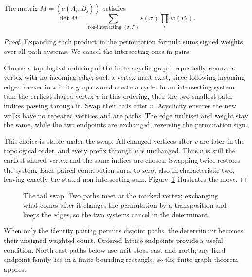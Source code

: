 \begin{theorem}\label{linear:thm:lgv}
The matrix $M=(e(A_i,B_j))$ satisfies
\[\det M=\sum_{\text{non-intersecting }(\sigma,P)}\varepsilon(\sigma)\prod_iw(P_i).\]
\end{theorem}
\begin{proof}
Expanding each product in the permutation formula sums signed weights over all path systems. We cancel the intersecting ones in pairs.

Choose a topological ordering of the finite acyclic graph: repeatedly remove a vertex with no incoming edge; such a vertex must exist, since following incoming edges forever in a finite graph would create a cycle. In an intersecting system, take the earliest shared vertex $v$ in this ordering, then the two smallest path indices passing through it. Swap their tails after $v$. Acyclicity ensures the new walks have no repeated vertices and are paths. The edge multiset and weight stay the same, while the two endpoints are exchanged, reversing the permutation sign.

This choice is stable under the swap. All changed vertices after $v$ are later in the topological order, and every prefix through $v$ is unchanged. Thus $v$ is still the earliest shared vertex and the same indices are chosen. Swapping twice restores the system. Each paired contribution sums to zero, also in characteristic two, leaving exactly the stated non-intersecting sum. Figure~\ref{linear:fig:lgv} illustrates the move.
\end{proof}
\begin{figure}[ht]
\centering
{}
\caption{The tail swap. Two paths meet at the marked vertex; exchanging what comes after it changes the permutation by a
transposition and keeps the edges, so the two systems cancel in the determinant.}
\label{linear:fig:lgv}
\end{figure}

When only the identity pairing permits disjoint paths, the determinant becomes their unsigned weighted count. Ordered lattice endpoints provide a useful condition. North-east paths below use unit steps east and north; any fixed endpoint family lies in a finite bounding rectangle, so the finite-graph theorem applies.

